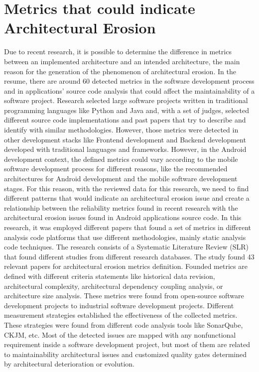 \section{Metrics that could indicate Architectural Erosion}
Due to recent research, it is possible to determine the difference in metrics between an implemented architecture and an intended architecture, the main reason for the generation of the phenomenon of architectural erosion. In the resume, there are around 60 detected metrics in the software development process and in applications' source code analysis that could affect the maintainability of a software project. Research selected large software projects written in traditional programming languages like Python and Java and, with a set of judges, selected different source code implementations and past papers that try to describe and identify with similar methodologies. However, those metrics were detected in other development stacks like Frontend development and Backend development developed with traditional languages and frameworks. However, in the Android development context, the defined metrics could vary according to the mobile software development process for different reasons, like the recommended architectures for Android development and the mobile software development stages. For this reason, with the reviewed data for this research, we need to find different patterns that would indicate an architectural erosion issue and create a relationship between the reliability metrics found in recent research with the architectural erosion issues found in Android applications source code.
In this research, it was employed different papers that found a set of metrics in different analysis code platforms that use different methodologies, mainly static analysis code techniques. The research consists of a Systematic Literature Review (SLR) that found different studies from different research databases. The study found 43 relevant papers for architectural erosion metrics definition. Founded metrics are defined with different criteria statements like historical data revision, architectural complexity, architectural dependency coupling analysis, or architecture size analysis. These metrics were found from open-source software development projects to industrial software development projects.
Different measurement strategies established the effectiveness of the collected metrics. These strategies were found from different code analysis tools like SonarQube, CKJM, etc. Most of the detected issues are mapped with any nonfunctional requirement inside a software development project, but most of them are related to maintainability architectural issues and customized quality gates determined by architectural deterioration or evolution.

